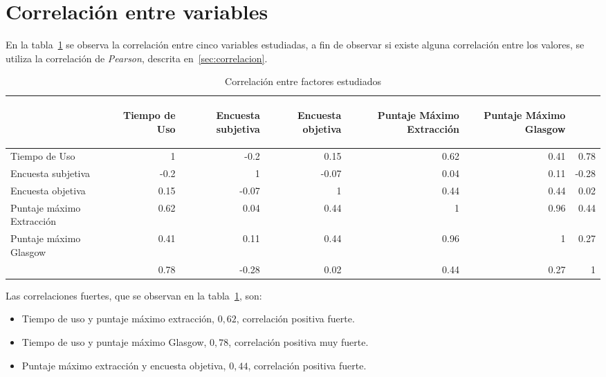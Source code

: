 \section{Correlación entre variables}

En la tabla~\ref{tab:all_correlation} se observa la correlación entre cinco
variables estudiadas, a fin de observar si existe alguna correlación entre los
valores, se utiliza la correlación de \emph{Pearson}, descrita
en~\ref{sec:correlacion}.

\begin{table}[H]
\centering
\begin{tabular}{lrrrrrr}
\toprule
        &
\begin{sideways}\textbf{Tiempo de Uso}\end{sideways}             &
\begin{sideways}\textbf{Encuesta subjetiva}\end{sideways}        &
\begin{sideways}\textbf{Encuesta objetiva}\end{sideways}         &
\begin{sideways}\textbf{Puntaje Máximo Extracción}\end{sideways} &
\begin{sideways}\textbf{Puntaje Máximo Glasgow}\end{sideways}    \\
\midrule
Tiempo de Uso             & 1    & -0.2  & 0.15  & 0.62 & 0.41 & 0.78 \\
Encuesta subjetiva        & -0.2 & 1     & -0.07 & 0.04 & 0.11 & -0.28\\
Encuesta objetiva         & 0.15 & -0.07 & 1     & 0.44 & 0.44 & 0.02 \\
Puntaje máximo Extracción & 0.62 & 0.04  & 0.44  & 1    & 0.96 & 0.44 \\
Puntaje máximo Glasgow    & 0.41 & 0.11  & 0.44  & 0.96 & 1    & 0.27 \\
\bottomrule               & 0.78 & -0.28 & 0.02  & 0.44 & 0.27 & 1    \\
\end{tabular}
\caption{Correlación entre factores estudiados} 
\label{tab:all_correlation}
\end{table}

Las correlaciones fuertes, que se observan en la
tabla~\ref{tab:all_correlation}, son:

\begin{itemize}
    \item Tiempo de uso y puntaje máximo extracción, $0,62$, correlación
        positiva fuerte.
    \item Tiempo de uso y puntaje máximo Glasgow, $0,78$, correlación positiva
        muy fuerte.
    \item Puntaje máximo extracción y encuesta objetiva, $0,44$, correlación
        positiva fuerte.
\end{itemize}


